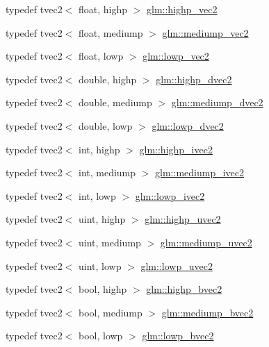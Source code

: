 \begin{DoxyCompactItemize}
\item 
typedef tvec2$<$ float, highp $>$ \hyperlink{group__core__precision_ga84532f0e0c7e2af99edd65dc182aba51}{glm\-::highp\-\_\-vec2}
\item 
typedef tvec2$<$ float, mediump $>$ \hyperlink{group__core__precision_ga949639029259b8bf5c4bc96bd2cc5a59}{glm\-::mediump\-\_\-vec2}
\item 
typedef tvec2$<$ float, lowp $>$ \hyperlink{group__core__precision_ga1b46182364e2054858f9e7a70f8c52bc}{glm\-::lowp\-\_\-vec2}
\item 
typedef tvec2$<$ double, highp $>$ \hyperlink{group__core__precision_ga74ad90a083be6c50f6c285d6ab15a198}{glm\-::highp\-\_\-dvec2}
\item 
typedef tvec2$<$ double, mediump $>$ \hyperlink{group__core__precision_gafc1ed63d5e5d1ddcf67752143f4f5871}{glm\-::mediump\-\_\-dvec2}
\item 
typedef tvec2$<$ double, lowp $>$ \hyperlink{group__core__precision_ga26ff2843d850f4f6ad591540e1ff1818}{glm\-::lowp\-\_\-dvec2}
\item 
typedef tvec2$<$ int, highp $>$ \hyperlink{group__core__precision_ga01acd79fbbe3d93a532276586b5c39ee}{glm\-::highp\-\_\-ivec2}
\item 
typedef tvec2$<$ int, mediump $>$ \hyperlink{group__core__precision_ga38b24c06ac0dfe4dcfbe7abf9a93dbb4}{glm\-::mediump\-\_\-ivec2}
\item 
typedef tvec2$<$ int, lowp $>$ \hyperlink{group__core__precision_gafae8c6e9da91f4c6c1b85af5b8513097}{glm\-::lowp\-\_\-ivec2}
\item 
typedef tvec2$<$ uint, highp $>$ \hyperlink{group__core__precision_ga386eaa1579a0f5ad51cd7d8fcd52ec16}{glm\-::highp\-\_\-uvec2}
\item 
typedef tvec2$<$ uint, mediump $>$ \hyperlink{group__core__precision_ga7ec96113b08a8435fd80dd623ffe3e05}{glm\-::mediump\-\_\-uvec2}
\item 
typedef tvec2$<$ uint, lowp $>$ \hyperlink{group__core__precision_ga0eec567054355374c84c7971a07d274c}{glm\-::lowp\-\_\-uvec2}
\item 
typedef tvec2$<$ bool, highp $>$ \hyperlink{group__core__precision_gaf76ced5823e8aace6bd257fac6c250cb}{glm\-::highp\-\_\-bvec2}
\item 
typedef tvec2$<$ bool, mediump $>$ \hyperlink{group__core__precision_gaf46a55555e71730f77b5c885d20ae8e2}{glm\-::mediump\-\_\-bvec2}
\item 
typedef tvec2$<$ bool, lowp $>$ \hyperlink{group__core__precision_gaf17553233b30d9ed413e822847c4ea8f}{glm\-::lowp\-\_\-bvec2}

\end{DoxyCompactItemize}
